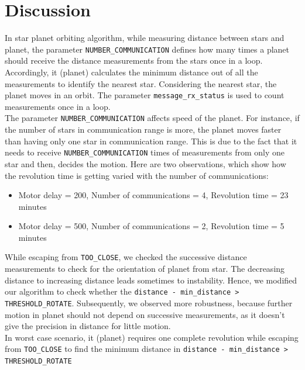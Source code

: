 \documentclass{report}[12pt]
\begin{document}


\section{Discussion}

In star planet orbiting algorithm, while measuring distance between stars and planet, the parameter \texttt{NUMBER\_COMMUNICATION} defines how many times a planet should receive the distance measurements from the stars once in a loop. Accordingly, it (planet) calculates the minimum distance out of all the measurements to identify the nearest star. Considering the nearest star, the planet moves in an orbit. The parameter \texttt{message\_rx\_status} is used to count measurements once in a loop.\\

The parameter \texttt{NUMBER\_COMMUNICATION} affects speed of the planet. For instance, if the number of stars in communication range is more, the planet moves faster than having only one star in communication range. This is due to the fact that it needs to receive \texttt{NUMBER\_COMMUNICATION} times of measurements  from only one star and then, decides the motion. Here are two observations, which show how the revolution time is getting varied with the number of  communications:
\begin{itemize}
	\item Motor delay = 200, Number of communications = 4, Revolution time
	      = 23 minutes
	\item Motor delay = 500, Number of communications = 2, Revolution time = 5 minutes
\end{itemize}

While escaping from \texttt{TOO\_CLOSE}, we checked the successive distance measurements to check for the orientation of planet from star. The decreasing distance to increasing distance leads sometimes to instability. Hence, we modified our algorithm to check whether the \texttt{distance - min\_distance > THRESHOLD\_ROTATE}. Subsequently, we observed more robustness, because further motion in planet should not depend on successive measurements, as it doesn't give the precision in distance for little motion.\\

In worst case scenario, it (planet) requires one complete revolution while escaping from \texttt{TOO\_CLOSE} to find the minimum distance in \texttt{distance - min\_distance > THRESHOLD\_ROTATE}
\end{document}
